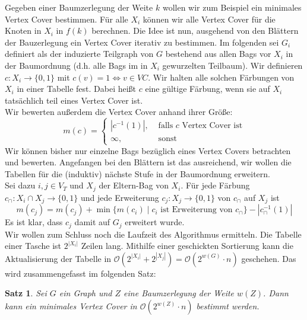 \documentclass[a4paper, 12pt]{article}
\theoremstyle{plain}
\newtheorem{theorem}{Satz}[section] %
\theoremstyle{definition}
\theoremstyle{lemma}
\theoremstyle{remark}
\theoremstyle{corollary}
\theoremstyle{example}
\begin{document}
	Gegeben einer Baumzerlegung der Weite $k$ wollen wir zum Beispiel ein minimales Vertex Cover bestimmen. Für alle $X_i$ können wir alle Vertex Cover für die Knoten in $X_i$ in $f(k)$ berechnen. Die Idee ist nun, ausgehend von den Blättern der Bauzerlegung ein Vertex Cover iterativ zu bestimmen. Im folgenden sei $G_i$ definiert als der induzierte Teilgraph von $G$ bestehend aus allen Bags vor $X_i$ in der Baumordnung (d.h. alle Bags im in $X_i$ gewurzelten Teilbaum). Wir definieren $c: X_i \to \{0,1\}$ mit $c(v) = 1 \Leftrightarrow v \in VC$. Wir halten alle solchen Färbungen von $X_i$ in einer Tabelle fest. Dabei heißt $c$ eine gültige Färbung, wenn sie auf $X_i$ tatsächlich teil eines Vertex Cover ist.\\
	Wir bewerten außerdem die Vertex Cover anhand ihrer Größe: \[
		m(c) = \begin{cases}
			\left|c^{-1}(1)\right|, & \text{ falls $c$ Vertex Cover ist}\\
			\infty, & \text{ sonst}
		\end{cases}\]
	Wir können bisher nur einzelne Bags bezüglich eines Vertex Covers betrachten und bewerten. Angefangen bei den Blättern ist das ausreichend, wir wollen die Tabellen für die (induktiv) nächste Stufe in der Baumordnung erweitern.\\
	Sei dazu $i,j \in V_T$ und $X_j$ der Eltern-Bag von $X_i$. Für jede Färbung $c_\cap: X_i \cap X_j \to \{0,1\}$ und jede Erweiterung $c_j: X_j \to \{0,1\}$ von $c_\cap$ auf $X_j$ ist \[m(c_j) = m(c_j) + \min\{m(c_i) \mid c_i \text{ ist Erweiterung von } c_\cap\} - \left|c_\cap^{-1}(1)\right|\] Es ist klar, dass $c_j$ damit auf $G_j$ erweitert wurde.\\
	Wir wollen zum Schluss noch die Laufzeit des Algorithmus ermitteln. Die Tabelle einer Tasche ist $2^{\left|X_i\right|}$ Zeilen lang. Mithilfe einer geschickten Sortierung kann die Aktualisierung der Tabelle in $\mathcal{O}(2^{\left|X_i\right|} + 2^{\left|X_j\right|}) = \mathcal{O}(2^{w(G)}\cdot n)$ geschehen. Das wird zusammengefasst im folgenden Satz:
	\begin{theorem}
		Sei $G$ ein Graph und $Z$ eine Baumzerlegung der Weite $w(Z)$. Dann kann ein minimales Vertex Cover in $\mathcal{O}(2^{w(Z)}\cdot n)$ bestimmt werden.
	\end{theorem}
\end{document}
